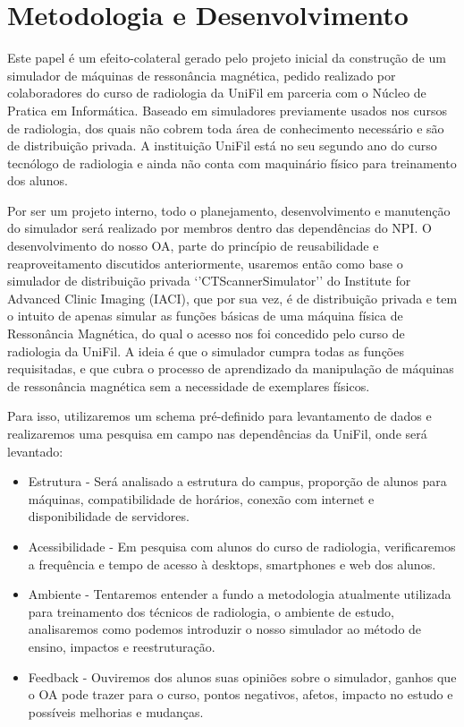 \documentclass[12pt,openright,oneside,a4paper,english,french,spanish,brazil]{unifil}
\begin{document}
\chapter{Metodologia e Desenvolvimento}

Este papel é um efeito-colateral gerado pelo projeto inicial da construção de um simulador de máquinas de ressonância magnética, pedido realizado por colaboradores do curso de radiologia da UniFil em parceria com o Núcleo de Pratica em Informática. Baseado em simuladores previamente usados nos cursos de radiologia, dos quais não cobrem toda área de conhecimento necessário e são de distribuição privada. A instituição UniFil está no seu segundo ano do curso tecnólogo de radiologia e ainda não conta com maquinário físico para treinamento dos alunos.
\par Por ser um projeto interno, todo o planejamento, desenvolvimento e manutenção do simulador será realizado por membros dentro das dependências do NPI.
O desenvolvimento do nosso OA, parte do princípio de reusabilidade e reaproveitamento discutidos anteriormente, usaremos então como base o simulador de distribuição privada `'CTScannerSimulator'' do Institute for Advanced Clinic Imaging (IACI), que por sua vez, é de distribuição privada e tem o intuito de apenas simular as funções básicas de uma máquina física de Ressonância Magnética, do qual o acesso nos foi concedido pelo curso de radiologia da UniFil. A ideia é que o simulador cumpra todas as funções requisitadas, e que cubra o processo de aprendizado da manipulação de máquinas de ressonância magnética sem a necessidade de exemplares físicos. 

\par Para isso, utilizaremos um schema pré-definido para levantamento de dados e realizaremos uma pesquisa em campo nas dependências da UniFil, onde será levantado:
\begin{itemize}
\item Estrutura - Será analisado a estrutura do campus, proporção de alunos para máquinas, compatibilidade de horários, conexão com internet e disponibilidade de servidores.
\item Acessibilidade - Em pesquisa com alunos do curso de radiologia, verificaremos a frequência e tempo de acesso à desktops, smartphones e web dos alunos.
\item Ambiente - Tentaremos entender a fundo a metodologia atualmente utilizada para treinamento dos técnicos de radiologia, o ambiente de estudo, analisaremos como podemos introduzir o nosso simulador ao método de ensino, impactos e reestruturação.
\item Feedback - Ouviremos dos alunos suas opiniões sobre o simulador, ganhos que o OA pode trazer para o curso, pontos negativos, afetos, impacto no estudo e possíveis melhorias e mudanças.
\end{itemize}
\end{document}
